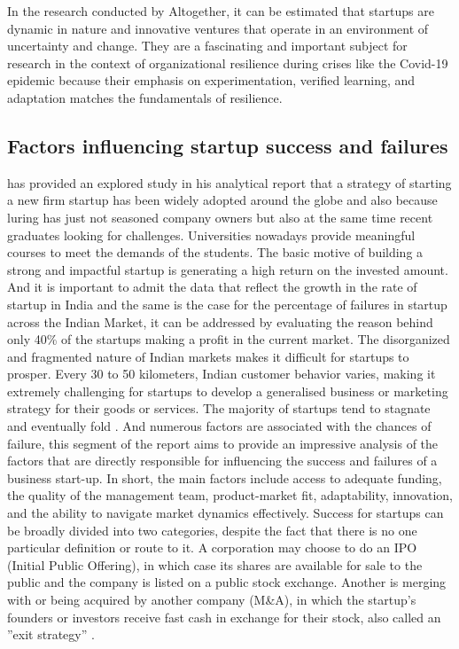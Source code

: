 \documentclass[12pt]{article}
\begin{document}
In the research conducted by \citep{raheja2023machine} Altogether, it can be estimated that startups are dynamic in nature and innovative ventures that operate in an environment of uncertainty and change. They are a fascinating and important subject for research in the context of organizational resilience during crises like the Covid-19 epidemic because their emphasis on experimentation, verified learning, and adaptation matches the fundamentals of resilience. 

\subsection{Factors influencing startup success and failures}
\citep{zhang2022startups} has provided an explored study in his analytical report that a strategy of starting a new firm startup has been widely adopted around the globe and also because luring has just not seasoned company owners but also at the same time recent graduates looking for challenges. Universities nowadays provide meaningful courses to meet the demands of the students. The basic motive of building a strong and impactful startup is generating a high return on the invested amount. And it is important to admit the data that reflect the growth in the rate of startup in India and the same is the case for the percentage of failures in startup across the Indian Market, it can be addressed by evaluating the reason behind only 40\% of the startups making a profit in the current market. The disorganized and fragmented nature of Indian markets makes it difficult for startups to prosper. Every 30 to 50 kilometers, Indian customer behavior varies, making it extremely challenging for
startups to develop a generalised business or marketing strategy for their goods or services. The majority of startups tend to stagnate and eventually fold \citep{sharma2019challenges}. And numerous factors are associated with the chances of failure, this segment of the report aims to provide an impressive analysis of the factors that are directly responsible for influencing the success and failures of a business start-up.  In short, the main factors include access to adequate funding, the quality of the management team, product-market fit, adaptability, innovation, and the ability to navigate market dynamics effectively. Success for startups can be broadly divided into two categories, despite the fact that there is no one particular definition or route to it. A corporation may choose to do an IPO (Initial Public Offering), in which case its shares are available for sale to the public and the company is listed on a public stock exchange. Another is merging with or being acquired by another company (M\&A), in which the startup’s founders or investors receive fast cash in exchange for their stock, also called an ”exit
strategy” \citep{bangdiwala2022predicting}.
\end{document}

